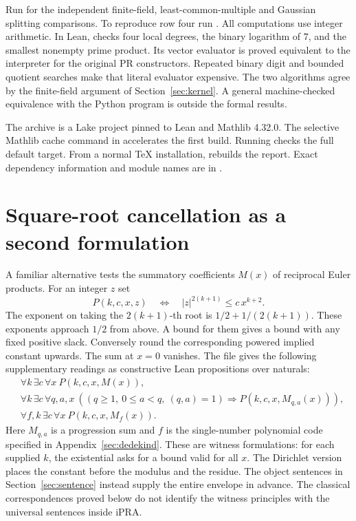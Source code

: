 \documentclass[11pt]{article}
\begin{document}
Run  for the independent finite-field, least-common-multiple and Gaussian splitting comparisons. To reproduce row four run . All computations use integer arithmetic. In Lean,  checks four local degrees, the binary logarithm of \(7\), and the smallest nonempty prime product. Its vector evaluator is proved equivalent to the interpreter for the original PR constructors. Repeated binary digit and bounded quotient searches make that literal evaluator expensive. The two algorithms agree by the finite-field argument of Section~\ref{sec:kernel}. A general machine-checked equivalence with the Python program is outside the formal results.

The archive is a Lake project pinned to Lean and Mathlib 4.32.0. The selective Mathlib cache command in  accelerates the first build. Running  checks the full default target. From a normal TeX installation,  rebuilds the report. Exact dependency information and module names are in .

\newpage








\newpage
\appendix\newpage
\section{Square-root cancellation as a second formulation}\label{sec:mertens-start}
A familiar alternative tests the summatory coefficients \(M(x)\) of reciprocal Euler products. For an integer \(z\) set
\[
    P(k,c,x,z)\quad\Longleftrightarrow\quad
     |z|^{2(k+1)}\le c\,x^{k+2}.
\]
The exponent on taking the \(2(k+1)\)-th root is \(1/2+1/(2(k+1))\). These exponents approach \(1/2\) from above. A bound for them gives a bound with any fixed positive slack. Conversely round the corresponding powered implied constant upwards. The sum at \(x=0\) vanishes. The file  gives the following supplementary readings as constructive Lean propositions over naturals:
\begin{align*}
 &\forall k\,\exists c\,\forall x\ P(k,c,x,M(x)),\\
 &\forall k\,\exists c\,\forall q,a,x\
    ((q\ge1,\ 0\le a<q,\ (q,a)=1)\Rightarrow P(k,c,x,M_{q,a}(x))),\\
 &\forall f,k\,\exists c\,\forall x\ P(k,c,x,M_f(x)).
\end{align*}
Here \(M_{q,a}\) is a progression sum and \(f\) is the single-number polynomial code specified in Appendix~\ref{sec:dedekind}. These are witness formulations: for each supplied \(k\), the existential asks for a bound valid for all \(x\). The Dirichlet version places the constant before the modulus and the residue. The object sentences in Section~\ref{sec:sentence} instead supply the entire envelope in advance. The classical correspondences proved below do not identify the witness principles with the universal sentences inside iPRA.
\end{document}
